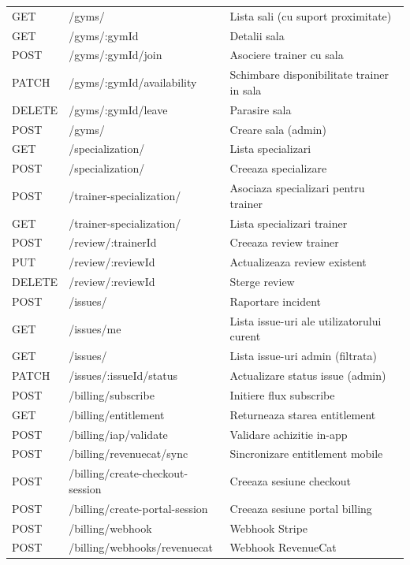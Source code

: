 \begin{longtable}{p{} p{} p{}}
GET & /gyms/ & Lista sali (cu suport proximitate) \\
GET & /gyms/:gymId & Detalii sala \\
POST & /gyms/:gymId/join & Asociere trainer cu sala \\
PATCH & /gyms/:gymId/availability & Schimbare disponibilitate trainer in sala \\
DELETE & /gyms/:gymId/leave & Parasire sala \\
POST & /gyms/ & Creare sala (admin) \\

GET & /specialization/ & Lista specializari \\
POST & /specialization/ & Creeaza specializare \\
POST & /trainer-specialization/ & Asociaza specializari pentru trainer \\
GET & /trainer-specialization/ & Lista specializari trainer \\

POST & /review/:trainerId & Creeaza review trainer \\
PUT & /review/:reviewId & Actualizeaza review existent \\
DELETE & /review/:reviewId & Sterge review \\

POST & /issues/ & Raportare incident \\
GET & /issues/me & Lista issue-uri ale utilizatorului curent \\
GET & /issues/ & Lista issue-uri admin (filtrata) \\
PATCH & /issues/:issueId/status & Actualizare status issue (admin) \\

POST & /billing/subscribe & Initiere flux subscribe \\
GET & /billing/entitlement & Returneaza starea entitlement \\
POST & /billing/iap/validate & Validare achizitie in-app \\
POST & /billing/revenuecat/sync & Sincronizare entitlement mobile \\
POST & /billing/create-checkout-session & Creeaza sesiune checkout \\
POST & /billing/create-portal-session & Creeaza sesiune portal billing \\
POST & /billing/webhook & Webhook Stripe \\
POST & /billing/webhooks/revenuecat & Webhook RevenueCat \\


\end{longtable}
